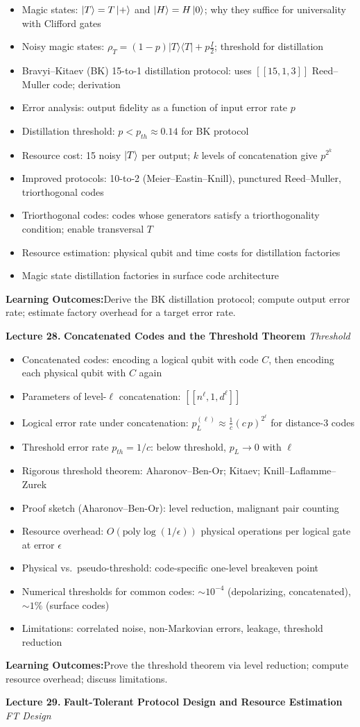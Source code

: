 \documentclass[12pt,oneside]{article}
\newcommand{\proj}[1]{|#1\rangle\langle#1|}
\newcommand{\lecturetitle}[3]{%
  \vspace{10pt}
  \begin{tcolorbox}[
    enhanced,breakable,
    colback=highlight,colframe=accent,
    arc=2pt,left=10pt,right=8pt,top=7pt,bottom=7pt,boxrule=0.7pt
  ]
    \textbf{\color{accent}Lecture #1.\enspace}%
    {\color{primary}\bfseries #2}%
    \hfill{\small\color{warmgold}\textit{#3}}
  \end{tcolorbox}
  \vspace{-2pt}
}
\newcommand{\topics}[1]{%
  \begin{itemize}[leftmargin=1.5em,itemsep=1.5pt,topsep=3pt,parsep=0pt]
    #1
  \end{itemize}\vspace{2pt}
}
\newcommand{\T}[1]{\item #1}
\newcommand{\keybox}[1]{%
  \begin{tcolorbox}[
    enhanced,colback=lightgray,colframe=rulegray,
    arc=2pt,left=8pt,right=8pt,top=5pt,bottom=5pt,boxrule=0.4pt,
    fontupper=\small
  ]
    \textbf{\color{primary}Learning Outcomes:\enspace}#1
  \end{tcolorbox}\vspace{4pt}
}
\begin{document}
\topics{
  \T{Magic states: $\ket{T}=T\ket{+}$ and $\ket{H}=H\ket{0}$; why they suffice for universality with Clifford gates}
  \T{Noisy magic states: $\rho_T = (1-p)\proj{T} + p \frac{I}{2}$; threshold for distillation}
  \T{Bravyi--Kitaev (BK) 15-to-1 distillation protocol: uses $[[15,1,3]]$ Reed--Muller code; derivation}
  \T{Error analysis: output fidelity as a function of input error rate $p$}
  \T{Distillation threshold: $p < p_{th}\approx 0.14$ for BK protocol}
  \T{Resource cost: 15 noisy $\ket{T}$ per output; $k$ levels of concatenation give $p^{2^k}$}
  \T{Improved protocols: 10-to-2 (Meier--Eastin--Knill), punctured Reed--Muller, triorthogonal codes}
  \T{Triorthogonal codes: codes whose generators satisfy a triorthogonality condition; enable transversal $T$}
  \T{Resource estimation: physical qubit and time costs for distillation factories}
  \T{Magic state distillation factories in surface code architecture}
}

\keybox{Derive the BK distillation protocol; compute output error rate; estimate factory overhead for a target error rate.}

\lecturetitle{28}{Concatenated Codes and the Threshold Theorem}{Threshold}

\topics{
  \T{Concatenated codes: encoding a logical qubit with code $C$, then encoding each physical qubit with $C$ again}
  \T{Parameters of level-$\ell$ concatenation: $[[n^\ell, 1, d^\ell]]$}
  \T{Logical error rate under concatenation: $p_L^{(\ell)} \approx \frac{1}{c}\left(c\,p\right)^{2^\ell}$ for distance-3 codes}
  \T{Threshold error rate $p_{th} = 1/c$: below threshold, $p_L\to 0$ with $\ell$}
  \T{Rigorous threshold theorem: Aharonov--Ben-Or; Kitaev; Knill--Laflamme--Zurek}
  \T{Proof sketch (Aharonov--Ben-Or): level reduction, malignant pair counting}
  \T{Resource overhead: $O(\text{poly}\log(1/\epsilon))$ physical operations per logical gate at error $\epsilon$}
  \T{Physical vs.\ pseudo-threshold: code-specific one-level breakeven point}
  \T{Numerical thresholds for common codes: $\sim10^{-4}$ (depolarizing, concatenated), $\sim1\%$ (surface codes)}
  \T{Limitations: correlated noise, non-Markovian errors, leakage, threshold reduction}
}

\keybox{Prove the threshold theorem via level reduction; compute resource overhead; discuss limitations.}

\lecturetitle{29}{Fault-Tolerant Protocol Design and Resource Estimation}{FT Design}
\end{document}
